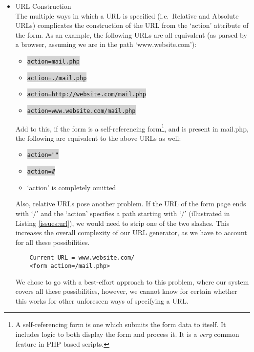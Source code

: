 \begin{itemize}
	\item URL Construction\\
	The multiple ways in which a URL is specified (i.e.\ Relative and Absolute URLs) complicates the construction of the URL from the `action' attribute of the form.  As an example, the following URLs are all equivalent (as parsed by a browser, assuming we are in the path `www.website.com'):
	
	\begin{itemize}
		\item \colorbox{lightgray}{\lstinline{action=mail.php}}
		\item \colorbox{lightgray}{\lstinline{action=./mail.php}}
		\item \colorbox{lightgray}{\lstinline{action=http://website.com/mail.php}}
		\item \colorbox{lightgray}{\lstinline{action=www.website.com/mail.php}}
	\end{itemize}
	Add to this, if the form is a self-referencing form\footnote{A self-referencing form is one which submits the form data to itself. It includes logic to both display the form and process it. It is a \emph{very} common feature in PHP based scripts.}, and is present in mail.php, the following are equivalent to the above URLs as well:
	\begin{itemize}
		\item \colorbox{lightgray}{\lstinline{action=""}}
		\item \colorbox{lightgray}{\lstinline{action=#}}
		\item `action' is completely omitted
	\end{itemize}
	Also, relative URLs pose another problem. If the URL of the form page ends with `/' and the `action' specifies a path starting with `/' (illustrated in Listing \ref{issues:url}), we would need to strip one of the two slashes. This increases the overall complexity of our URL generator, as we have to account for all these possibilities.
		
	\begin{lstlisting}
	Current URL = www.website.com/
	<form action=/mail.php>
	\end{lstlisting}
	
	We chose to go with a best-effort approach to this problem, where our system covers all these possibilities, however, we cannot know for certain whether this works for other unforeseen ways of specifying a URL.
	

\end{itemize}
